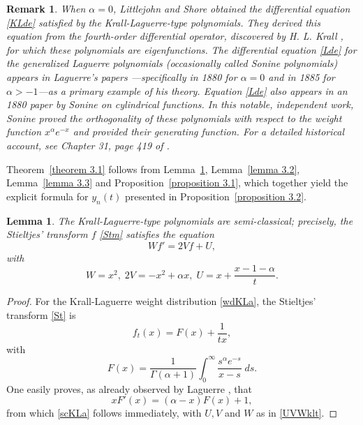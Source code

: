 \documentclass[10pt, reqno]{amsart}
\numberwithin{equation}{section}
\newtheorem{lemma}{Lemma}[section]
\newtheorem{remark}{Remark}[section]
\numberwithin{equation}{section}
\begin{document}
\begin{remark} \label{remark 3.1}
\emph{When \(\alpha = 0\), Littlejohn and Shore \cite{LLS} obtained the differential equation \eqref{KLde} satisfied by the Krall-Laguerre-type polynomials. They derived this equation from the fourth-order differential operator, discovered by H. L. Krall \cite{K2}, for which these polynomials are eigenfunctions. The differential equation \eqref{Lde} for the generalized Laguerre polynomials (occasionally called Sonine polynomials) appears in Laguerre’s papers \cite{Lag, La}\;---\;specifically in 1880 for $\alpha=0$ and in 1885 for $\alpha > -1$\;---\;as a primary example of his theory. Equation \eqref{Lde} also appears in an 1880 paper by Sonine \cite{So} on cylindrical functions. In this notable, independent work, Sonine proved the orthogonality of these polynomials with respect to the weight function $x^{\alpha }e^{-x}$ and provided their generating function. For a detailed historical account, see Chapter 31, page 419 of \cite{BRZ}}.
\end{remark} 
Theorem~\ref{theorem 3.1} follows from Lemma~\ref{lemma 3.1}, Lemma~\ref{lemma 3.2}, Lemma~\ref{lemma 3.3} and Proposition~\ref{proposition 3.1}, which together yield the explicit formula for $y_n(t)$ presented in Proposition~\ref{proposition 3.2}.
\begin{lemma}\label{lemma 3.1} 
The Krall-Laguerre-type polynomials are semi-classical; precisely, the Stieltjes' transform $f$ \eqref{Stm} satisfies the equation  
\begin{equation} 
Wf'=2Vf+U,\label{scKLa}
\end{equation}
with
\begin{equation}
W=x^2,\;2V=-x^2+\alpha x,\;U=x+\frac{x-1-\alpha}{t}.\label{UVWklt}
\end{equation}
\end{lemma}
\begin{proof}
For the Krall-Laguerre weight distribution \eqref{wdKLa}, the Stieltjes' transform \eqref{St} is 
\begin{equation*}
f_t(x)=F(x)+\frac{1}{tx},
\end{equation*}
with 
\begin{equation*}
F(x)=\frac{1}{\Gamma(\alpha+1)}\int_0^\infty \frac{s^{\alpha}e^{-s}}{x-s}\;ds.
\end{equation*}
One easily proves, as already observed by Laguerre \cite{La}, that
\begin{equation*}
xF'(x)=(\alpha-x)F(x)+1,
\end{equation*}
from which \eqref{scKLa} follows immediately, with $U,V$ and $W$ as in \eqref{UVWklt}.
\end{proof}
\end{document}
